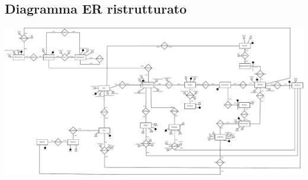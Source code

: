 \subsection{Diagramma ER ristrutturato}
\centerline{\includegraphics[width=18cm,keepaspectratio,angle=0]{src/progettazioneLogica/cantina_er_ristrutturato.pdf}}